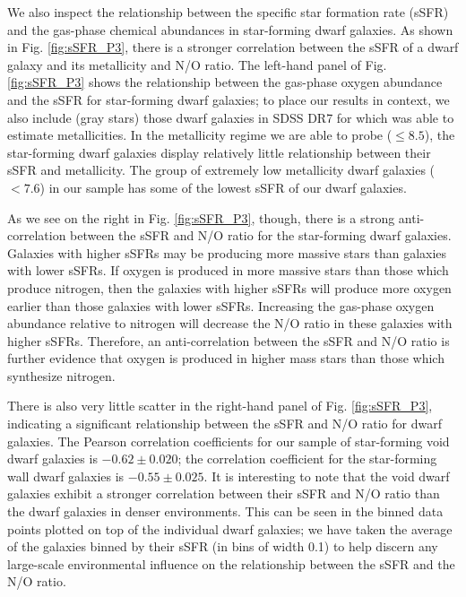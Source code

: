 We also inspect the relationship between the specific star formation rate (sSFR) 
and the gas-phase chemical abundances in star-forming dwarf galaxies.  As shown 
in Fig. \ref{fig:sSFR_P3}, there is a stronger correlation between the sSFR of a 
dwarf galaxy and its metallicity and N/O ratio.  The left-hand panel of Fig. 
\ref{fig:sSFR_P3} shows the relationship between the gas-phase oxygen abundance 
and the sSFR for star-forming dwarf galaxies; to place our results in context, 
we also include (gray stars) those dwarf galaxies in SDSS DR7 for which 
\cite{Tremonti04} was able to estimate metallicities.  In the metallicity regime 
we are able to probe (\OH $\leq 8.5$), the star-forming dwarf galaxies display 
relatively little relationship between their sSFR and metallicity.  The group of 
extremely low metallicity dwarf galaxies (\OH $< 7.6$) in our sample has some of 
the lowest sSFR of our dwarf galaxies.

As we see on the right in Fig. \ref{fig:sSFR_P3}, though, there is a strong 
anti-correlation between the sSFR and N/O ratio for the star-forming dwarf 
galaxies.  Galaxies with higher sSFRs may be producing more massive stars than 
galaxies with lower sSFRs.  If oxygen is produced in more massive stars than 
those which produce nitrogen, then the galaxies with higher sSFRs will produce 
more oxygen earlier than those galaxies with lower sSFRs.  Increasing the 
gas-phase oxygen abundance relative to nitrogen will decrease the N/O ratio in 
these galaxies with higher sSFRs.  Therefore, an anti-correlation between the 
sSFR and N/O ratio is further evidence that oxygen is produced in higher mass 
stars than those which synthesize nitrogen.

There is also very little scatter in the right-hand panel of Fig. 
\ref{fig:sSFR_P3}, indicating a significant relationship between the sSFR and 
N/O ratio for dwarf galaxies.  The Pearson correlation coefficients for our 
sample of star-forming void dwarf galaxies is $-0.62\pm 0.020$; the correlation 
coefficient for the star-forming wall dwarf galaxies is $-0.55\pm 0.025$.  It is 
interesting to note that the void dwarf galaxies exhibit a stronger correlation 
between their sSFR and N/O ratio than the dwarf galaxies in denser environments.  
This can be seen in the binned data points plotted on top of the individual 
dwarf galaxies; we have taken the average of the galaxies binned by their sSFR 
(in bins of width 0.1) to help discern any large-scale environmental influence 
on the relationship between the sSFR and the N/O ratio.



